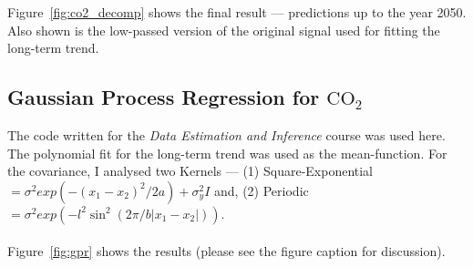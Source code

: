 \documentclass[11pt]{report}
\begin{document}
Figure~\ref{fig:co2_decomp} shows the final result --- predictions up to the year 2050. Also shown is the low-passed version of the original signal used for fitting the long-term trend.
\clearpage
\subsection*{Gaussian Process Regression for $\text{CO}_2$}
The code written for the \emph{Data Estimation and Inference}  course was used here. The polynomial fit for the long-term trend was used as the mean-function. For the covariance, I analysed two Kernels --- (1) Square-Exponential $= \sigma^2 exp\left(-(x_1-x_2)^2/2a\right) + \sigma_y^2I$ and, (2) Periodic $= \sigma^2 exp\left(-l^2\sin^2(2\pi/b|x_1-x_2|)\right)$.\\\\
Figure~\ref{fig:gpr} shows the results (please see the figure caption for discussion).
\end{document}
